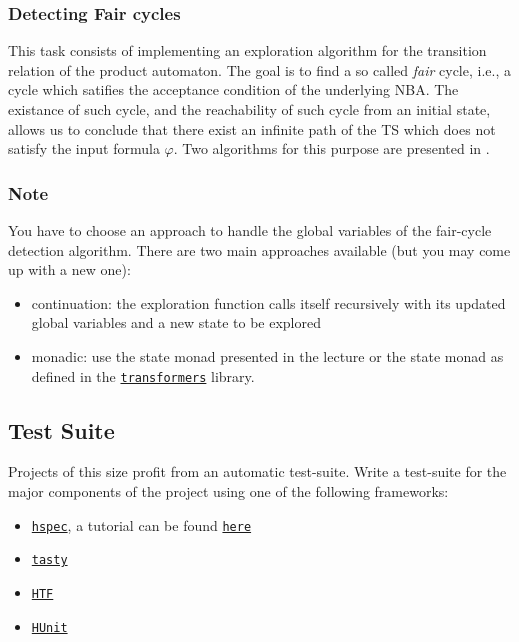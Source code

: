 \documentclass{article}
\begin{document}
\subsubsection*{Detecting Fair cycles}
This task consists of implementing an exploration algorithm for the transition relation of the product 
automaton. The goal is to find a so called \emph{fair} cycle, i.e., a cycle which satifies the acceptance 
condition of the underlying NBA. The existance of such cycle, and the reachability of such cycle from an 
initial state, allows us to conclude that there exist an infinite path of the TS which does not satisfy the input 
formula $\varphi$. Two algorithms for this purpose are presented in \cite[Section 4.4.2]{BaKa}.

\subsubsection*{Note}
You have to choose an approach to handle the global variables of the fair-cycle detection algorithm. 
There are two main approaches available (but you may come up with a new one):
\begin{itemize}
    \item continuation: the exploration function calls itself recursively with its updated global variables 
            and a new state to be explored 
    \item monadic: use the state monad presented in the lecture or the state monad 
            as defined in the \href{https://hackage.haskell.org/package/transformers}{\texttt{transformers}} library.
\end{itemize}

\subsection{Test Suite}
Projects of this size profit from an automatic test-suite. 
Write a test-suite for the major components of the project using one of the following frameworks:

\begin{itemize}
\item \href{https://hackage.haskell.org/package/hspec}{\texttt{hspec}}, a tutorial can be found \href{https://hspec.github.io/}{\texttt{here}}
\item \href{https://hackage.haskell.org/package/tasty}{\texttt{tasty}}
\item \href{https://hackage.haskell.org/package/HTF}{\texttt{HTF}}
\item \href{https://hackage.haskell.org/package/HUnit}{\texttt{HUnit}}
\end{itemize}
\end{document}
